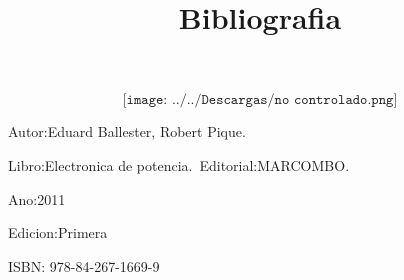\documentclass[12pt,a4paper]{report}
\begin{document}
$$\texttt{[image: ../../Descargas/no controlado.png]} $$

\newpage
\title{Bibliografia}


Autor:Eduard Ballester, Robert Pique.\

Libro:Electronica de potencia.\
Editorial:MARCOMBO.\

Ano:2011\

Edicion:Primera\

ISBN: 978-84-267-1669-9\
\end{document}
